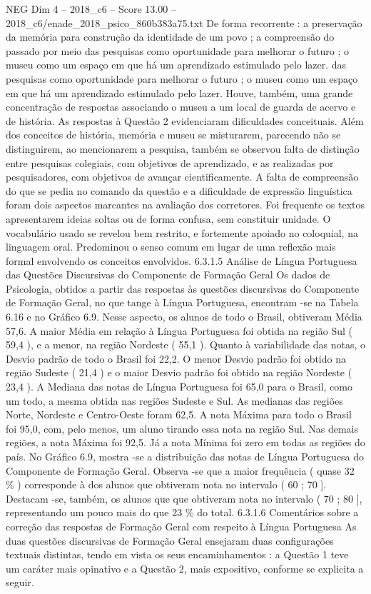 \begin{textsample}{NEG Dim 4 – 2018\_c6 – Score 13.00 – 2018\_c6/enade\_2018\_psico\_860b383a75.txt}
De forma recorrente : a preservação da memória para construção da identidade de um povo ; a compreensão do passado por meio das pesquisas como oportunidade para melhorar o futuro ; o museu como um espaço em que há um aprendizado estimulado pelo lazer. das pesquisas como oportunidade para melhorar o futuro ; o museu como um espaço em que há um aprendizado estimulado pelo lazer.
Houve, também, uma grande concentração de respostas associando o museu a um local de guarda de acervo e de história.
As respostas à Questão 2 evidenciaram dificuldades conceituais.
Além dos conceitos de história, memória e museu se misturarem, parecendo não se distinguirem, ao mencionarem a pesquisa, também se observou falta de distinção entre pesquisas colegiais, com objetivos de aprendizado, e as realizadas por pesquisadores, com objetivos de avançar cientificamente.
A falta de compreensão do que se pedia no comando da questão e a dificuldade de expressão linguística foram dois aspectos marcantes na avaliação dos corretores.
Foi frequente os textos apresentarem ideias soltas ou de forma confusa, sem constituir unidade.
O vocabulário usado se revelou bem restrito, e fortemente apoiado no coloquial, na linguagem oral.
Predominou o senso comum em lugar de uma reflexão mais formal envolvendo os conceitos envolvidos. 6.3.1.5 Análise de Língua Portuguesa das Questões Discursivas do Componente de Formação Geral Os dados de Psicologia, obtidos a partir das respostas às questões discursivas do Componente de Formação Geral, no que tange à Língua Portuguesa, encontram -se na Tabela 6.16 e no Gráfico 6.9.
Nesse aspecto, os alunos de todo o Brasil, obtiveram Média 57,6.
A maior Média em relação à Língua Portuguesa foi obtida na região Sul ( 59,4 ), e a menor, na região Nordeste ( 55,1 ).
Quanto à variabilidade das notas, o Desvio padrão de todo o Brasil foi 22,2.
O menor Desvio padrão foi obtido na região Sudeste ( 21,4 ) e o maior Desvio padrão foi obtido na região Nordeste ( 23,4 ).
A Mediana das notas de Língua Portuguesa foi 65,0 para o Brasil, como um todo, a mesma obtida nas regiões Sudeste e Sul.
As medianas das regiões Norte, Nordeste e Centro-Oeste foram 62,5.
A nota Máxima para todo o Brasil foi 95,0, com, pelo menos, um aluno tirando essa nota na região Sul.
Nas demais regiões, a nota Máxima foi 92,5.
Já a nota Mínima foi zero em todas as regiões do país.
No Gráfico 6.9, mostra -se a distribuição das notas de Língua Portuguesa do Componente de Formação Geral.
Observa -se que a maior frequência ( quase 32 \% ) corresponde à dos alunos que obtiveram nota no intervalo ( 60 ; 70 ].
Destacam -se, também, os alunos que que obtiveram nota no intervalo ( 70 ; 80 ], representando um pouco mais do que 23 \% do total. 6.3.1.6 Comentários sobre a correção das respostas de Formação Geral com respeito à Língua Portuguesa As duas questões discursivas de Formação Geral ensejaram duas configurações textuais distintas, tendo em vista os seus encaminhamentos : a Questão 1 teve um caráter mais opinativo e a Questão 2, mais expositivo, conforme se explicita a seguir.

\end{textsample}

